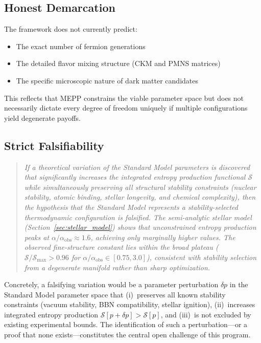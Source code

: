 \documentclass[12pt,a4paper]{article}
\theoremstyle{remark}
\begin{document}
\subsection{Honest Demarcation}

The framework does not currently predict:
\begin{itemize}
    \item The exact number of fermion generations
    \item The detailed flavor mixing structure (CKM and PMNS matrices)
    \item The specific microscopic nature of dark matter candidates
\end{itemize}

This reflects that MEPP constrains the viable parameter space but does not necessarily dictate every degree of freedom uniquely if multiple configurations yield degenerate payoffs.

\subsection{Strict Falsifiability}

\begin{quote}
\textit{If a theoretical variation of the Standard Model parameters is discovered that significantly increases the integrated entropy production functional $\mathcal{S}$ while simultaneously preserving all structural stability constraints (nuclear stability, atomic binding, stellar longevity, and chemical complexity), then the hypothesis that the Standard Model represents a stability-selected thermodynamic configuration is falsified. The semi-analytic stellar model (Section~\ref{sec:stellar_model}) shows that unconstrained entropy production peaks at $\alpha/\alpha_{\mathrm{obs}} \approx 1.6$, achieving only marginally higher values. The observed fine-structure constant lies within the broad plateau ($\mathcal{S}/\mathcal{S}_{\max} > 0.96$ for $\alpha/\alpha_{\mathrm{obs}} \in [0.75, 3.0]$), consistent with stability selection from a degenerate manifold rather than sharp optimization.}
\end{quote}

\noindent Concretely, a falsifying variation would be a parameter perturbation $\delta p$ in the Standard Model parameter space that (i)~preserves all known stability constraints (vacuum stability, BBN compatibility, stellar ignition), (ii)~increases integrated entropy production $\mathcal{S}[p + \delta p] > \mathcal{S}[p]$, and (iii)~is not excluded by existing experimental bounds. The identification of such a perturbation---or a proof that none exists---constitutes the central open challenge of this program.
\end{document}
